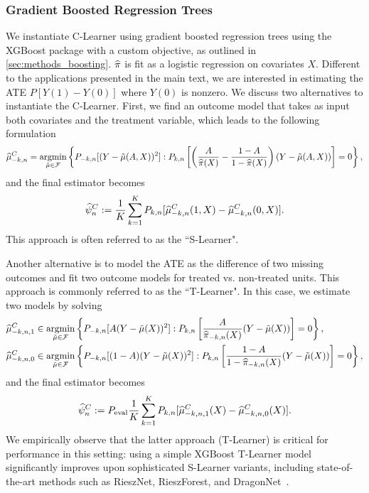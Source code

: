 \subsubsection{Gradient Boosted Regression Trees}
\label{sec:ihdp_xgb}
We instantiate C-Learner using gradient boosted regression trees using the XGBoost package \citep{xgb} with a custom objective, as outlined in \cref{sec:methods_boosting}. $\widehat{\pi}$ is fit as a logistic regression on covariates $X$. %
Different to the applications presented in the main text, we are interested in estimating the ATE $P[Y(1) - Y(0)]$ where $Y(0)$ is nonzero. We discuss two alternatives to instantiate the C-Learner. First, we find an outcome model that takes as input both covariates and the treatment variable, which leads to the following formulation
\begin{equation*}\label{eq:c-learner-full}
\widehat{\mu}^C_{-k,n}=\mathop{\rm argmin}_{\tilde\mu\in\mathcal F} 
\left\{ P_{-k,n}[(Y-\tilde\mu(A,X))^2] : 
P_{k,n}\left[\left(\frac{A}{\widehat{\pi}(X)}-\frac{1-A}{1-\widehat{\pi}(X)}\right)(Y-\tilde\mu(A,X))\right]=0
\right\},
\end{equation*}
and the final estimator becomes
\begin{align*}
    \widehat{\psi}^C_n :=\frac{1}{K}\sum_{k=1}^K P_{k,n}[\widehat{\mu}_{-k,n}^C(1,X)-\widehat{\mu}_{-k,n}^C(0,X)].
\label{eq:c_learner_def_xgb}
\end{align*}
This approach is often referred to as the ``S-Learner".


Another alternative is to model the ATE as the difference of two missing outcomes and fit two outcome models for treated vs. non-treated units. This approach is commonly referred to as the ``T-Learner". In this case, we estimate two models by solving
\begin{align*}
\widehat{\mu}_{-k, n, 1}^C 
& \in \mathop{\rm argmin}_{\tilde{\mu} \in \mathcal{F}}
\left\{ P_{-k, n} [ A (Y - \tilde{\mu}(X))^2]:
P_{k,n}\left[\frac{A}{\widehat{\pi}_{-k,n}(X)}(Y-\tilde{\mu}(X))\right]=0
\right\}, \\
\widehat{\mu}_{-k, n, 0}^C 
& \in \mathop{\rm argmin}_{\tilde{\mu} \in \mathcal{F}}
\left\{ P_{-k, n} [ (1-A) (Y - \tilde{\mu}(X))^2]:
P_{k,n}\left[\frac{1-A}{1-\widehat{\pi}_{-k,n}(X)}(Y-\tilde{\mu}(X))\right]=0
\right\},
\end{align*}
and the final estimator becomes
\begin{align*}
    \widehat{\psi}^C_n :=P_{\rm eval}\frac{1}{K}\sum_{k=1}^K P_{k,n}[\widehat{\mu}_{-k,n,1}^C(X)-\widehat{\mu}_{-k,n,0}^C(X)].
\end{align*}
We empirically observe that the latter approach (T-Learner) is critical for performance in this setting: using a simple XGBoost T-Learner model significantly improves upon sophisticated S-Learner variants, including state-of-the-art methods such as RieszNet, RieszForest, and DragonNet~\cite{chernozhukov2022riesznet,shi2019adapting}.
 
